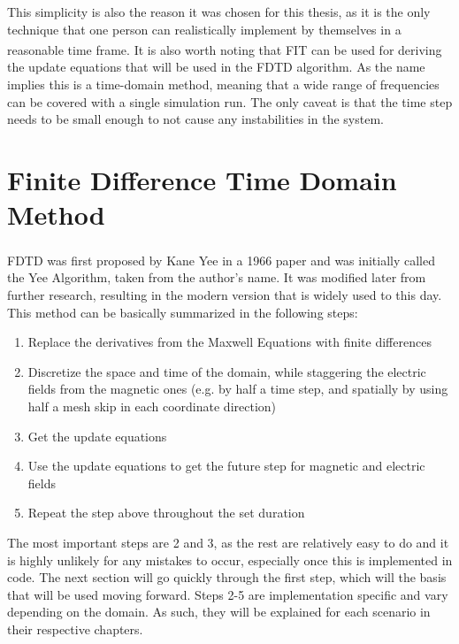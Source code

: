 This simplicity is also the reason it was chosen for this thesis, as it is the only technique that one person can realistically implement by themselves in a reasonable time frame.\textsuperscript{\cite{davidson2010computational}} It is also worth noting that FIT can be used for deriving the update equations that will be used in the FDTD algorithm. As the name implies this is a time-domain method, meaning that a wide range of frequencies can be covered with a single simulation run. The only caveat is that the time step needs to be small enough to not cause any instabilities in the system.


\section{Finite Difference Time Domain Method}

FDTD was first proposed by Kane Yee in a 1966 paper\textsuperscript{\cite{yee1966numerical}} and was initially called the Yee Algorithm, taken from the author's name. It was modified later from further research, resulting in the modern version that is widely used to this day. This method can be basically summarized in the following steps:

\begin{enumerate}
	\item Replace the derivatives from the Maxwell Equations with finite differences
	\item Discretize the space and time of the domain, while staggering the electric fields from the magnetic ones (e.g. by half a time step, and spatially by using half a mesh skip in each coordinate direction)
	\item Get the update equations
	\item Use the update equations to get the future step for magnetic and electric fields
	\item Repeat the step above throughout the set duration
\end{enumerate}

The most important steps are 2 and 3, as the rest are relatively easy to do and it is highly unlikely for any mistakes to occur, especially once this is implemented in code. The next section will go quickly through the first step, which will the basis that will be used moving forward. Steps 2-5 are implementation specific and vary depending on the domain. As such, they will be explained for each scenario in their respective chapters.


